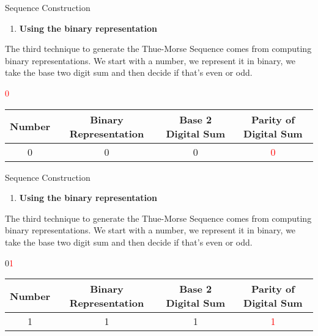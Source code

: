 \documentclass{beamer}
\begin{document}
\begin{frame}{Sequence Construction}
    \scriptsize
    \begin{enumerate}[3]
    \item \textbf{\large Using the binary representation}
    \end{enumerate}
    \begin{center}
        \normalsize The third technique to generate the Thue-Morse Sequence comes from computing binary representations. We start with a number, we represent it in binary, we take the base two digit sum and then decide if that's even or odd.
    \end{center}

    \vfill

    \begin{center} 
        \textcolor{red}{0}
    \end{center}

    \vfill

    \begin{center}
    \begin{tabular}{c|c|c|c|}
   
    \textbf{Number} & \textbf{Binary Representation} & \textbf{Base 2 Digital Sum} & \textbf{Parity of Digital Sum} \\ \hline
    0 & 0 & 0 & \textcolor{red}{0}
    \end{tabular}
    \end{center}

\end{frame}

\begin{frame}{Sequence Construction}
    \scriptsize
    \begin{enumerate}[3]
    \item \textbf{\large Using the binary representation}
    \end{enumerate}
    \begin{center}
        \normalsize The third technique to generate the Thue-Morse Sequence comes from computing binary representations. We start with a number, we represent it in binary, we take the base two digit sum and then decide if that's even or odd.
    \end{center}

    \vfill

    \begin{center} 
        0\textcolor{red}{1}
    \end{center}

    \vfill

    \begin{center}
    \begin{tabular}{c|c|c|c|}
   
    \textbf{Number} & \textbf{Binary Representation} & \textbf{Base 2 Digital Sum} & \textbf{Parity of Digital Sum} \\ \hline
    1 & 1 & 1 & \textcolor{red}{1}
    \end{tabular}
    \end{center}

\end{frame}
\end{document}

